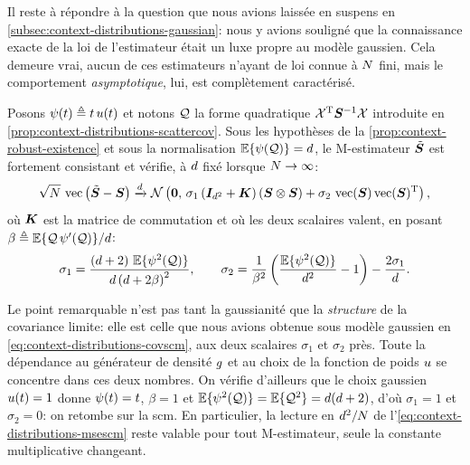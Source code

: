 Il reste à répondre à la question que nous avions laissée en suspens en \cref{subsec:context-distributions-gaussian}: nous y avions souligné que la connaissance exacte de la loi de l'estimateur était un luxe propre au modèle gaussien. Cela demeure vrai, aucun de ces estimateurs n'ayant de loi connue à $N$ fini, mais le comportement \emph{asymptotique}, lui, est complètement caractérisé.

\begin{proposition}
\label{prop:context-robust-asymptotic}
  Posons $\psi(t)\triangleq t\,u(t)$ et notons $\mathcal{Q}$ la forme quadratique $\mathcal{X}^{\mathrm{T}} {\boldsymbol{S}}^{-1} \mathcal{X}$ introduite en \cref{prop:context-distributions-scattercov}. Sous les hypothèses de la \cref{prop:context-robust-existence} et sous la normalisation $\operatorname{\mathbb{E}}\{\psi(\mathcal{Q})\}=d$, le M-estimateur $\tilde{\boldsymbol{S}}$ est fortement consistant et vérifie, à $d$ fixé lorsque $N\to\infty$:
  \begin{equation}
    \label{eq:context-robust-asymptotic}
    \sqrt{N}\,\operatorname{vec}\left(\tilde{\boldsymbol{S}}-\boldsymbol{S}\right)
    \xrightarrow{d}
    \mathcal{N}\left(\boldsymbol{0},\,
    \sigma_1\left(\boldsymbol{I}_{d^2}+\boldsymbol{K}\right)\left(\boldsymbol{S}\otimes\boldsymbol{S}\right)
    + \sigma_2\,\operatorname{vec}(\boldsymbol{S})\operatorname{vec}(\boldsymbol{S})^{\mathrm{T}}\right),
  \end{equation}
  où $\boldsymbol{K}$ est la matrice de commutation et où les deux scalaires valent, en posant $\beta\triangleq\operatorname{\mathbb{E}}\{\mathcal{Q}\,\psi'(\mathcal{Q})\}/d$:
  \begin{equation}
    \label{eq:context-robust-sigmas}
    \sigma_1 = \frac{(d+2)\,\operatorname{\mathbb{E}}\{\psi^2(\mathcal{Q})\}}{d\left(d+2\beta\right)^{2}},
    \qquad
    \sigma_2 = \frac{1}{\beta^{2}}\left(\frac{\operatorname{\mathbb{E}}\{\psi^2(\mathcal{Q})\}}{d^{2}}-1\right) - \frac{2\sigma_1}{d}.
  \end{equation}
\end{proposition}

\begin{remark}
  Le point remarquable n'est pas tant la gaussianité que la \emph{structure} de la covariance limite: elle est celle que nous avions obtenue sous modèle gaussien en \cref{eq:context-distributions-covscm}, aux deux scalaires $\sigma_1$ et $\sigma_2$ près. Toute la dépendance au générateur de densité $g$ et au choix de la fonction de poids $u$ se concentre dans ces deux nombres. On vérifie d'ailleurs que le choix gaussien $u(t)=1$ donne $\psi(t)=t$, $\beta=1$ et $\operatorname{\mathbb{E}}\{\psi^2(\mathcal{Q})\}=\operatorname{\mathbb{E}}\{\mathcal{Q}^2\}=d(d+2)$, d'où $\sigma_1=1$ et $\sigma_2=0$: on retombe sur la scm. En particulier, la lecture en $d^2/N$ de l'\cref{eq:context-distributions-msescm} reste valable pour tout M-estimateur, seule la constante multiplicative changeant.
\end{remark}

